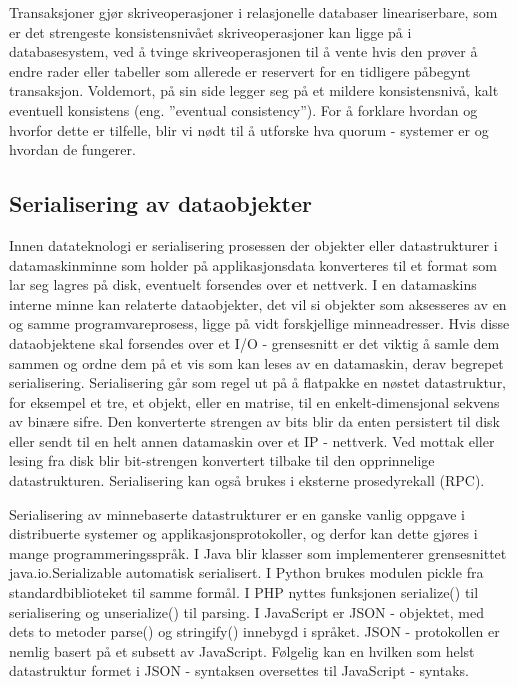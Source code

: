 Transaksjoner gjør skriveoperasjoner i relasjonelle databaser lineariserbare, som er det strengeste konsistensnivået skriveoperasjoner kan ligge på i databasesystem, ved å tvinge skriveoperasjonen til å vente hvis den prøver å endre rader eller tabeller som allerede er reservert for en tidligere påbegynt transaksjon. Voldemort, på sin side legger seg på et mildere konsistensnivå, kalt eventuell konsistens (eng. ''eventual consistency''). For å forklare hvordan og hvorfor dette er tilfelle, blir vi nødt til å utforske hva quorum - systemer er og hvordan de fungerer.

\subsection{Serialisering av dataobjekter}
Innen datateknologi er serialisering prosessen der objekter eller datastrukturer i datamaskinminne som holder på applikasjonsdata konverteres til et format som lar seg lagres på disk, eventuelt forsendes over et nettverk. I en datamaskins interne minne kan relaterte dataobjekter, det vil si objekter som aksesseres av en og samme programvareprosess, ligge på vidt forskjellige minneadresser. Hvis disse dataobjektene skal forsendes over et I/O - grensesnitt er det viktig å samle dem sammen og ordne dem på et vis som kan leses av en datamaskin, derav begrepet serialisering. Serialisering går som regel ut på å flatpakke en nøstet datastruktur, for eksempel et tre, et objekt, eller en matrise, til en enkelt-dimensjonal sekvens av binære sifre. Den konverterte strengen av bits blir da enten persistert til disk eller sendt til en helt annen datamaskin over et IP - nettverk. Ved mottak eller lesing fra disk blir bit-strengen konvertert tilbake til den opprinnelige datastrukturen. Serialisering kan også brukes i eksterne prosedyrekall (RPC).

Serialisering av minnebaserte datastrukturer er en ganske vanlig oppgave i distribuerte systemer og applikasjonsprotokoller, og derfor kan dette gjøres i mange programmeringsspråk. I Java blir klasser som implementerer grensesnittet java.io.Serializable automatisk serialisert. I Python brukes modulen pickle fra standardbiblioteket til samme formål. I PHP nyttes funksjonen serialize() til serialisering og unserialize() til parsing. I JavaScript er JSON - objektet, med dets to metoder parse() og stringify() innebygd i språket. JSON - protokollen er nemlig basert på et subsett av JavaScript. Følgelig kan en hvilken som helst datastruktur formet i JSON - syntaksen oversettes til JavaScript - syntaks.

